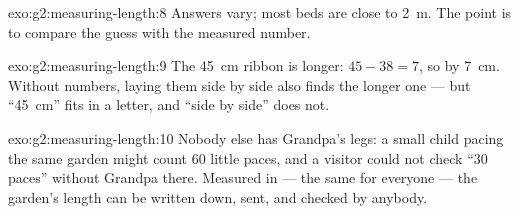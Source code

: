 \begin{solution}{exo:g2:measuring-length:8}
Answers vary; most beds are close to \qty{2}{m}. The point is to
compare the guess with the measured number.
\end{solution}

\begin{solution}{exo:g2:measuring-length:9}
The \qty{45}{cm} ribbon is longer: $45 - 38 = 7$, so by \qty{7}{cm}.
Without numbers, laying them side by side also finds the longer one
--- but ``\qty{45}{cm}'' fits in a letter, and ``side by side'' does
not.
\end{solution}

\begin{solution}{exo:g2:measuring-length:10}
Nobody else has Grandpa's legs: a small child pacing the same garden
might count $60$ little paces, and a visitor could not check ``$30$
paces'' without Grandpa there. Measured in  --- the same for
everyone --- the garden's length can be written down, sent, and
checked by anybody.
\end{solution}
